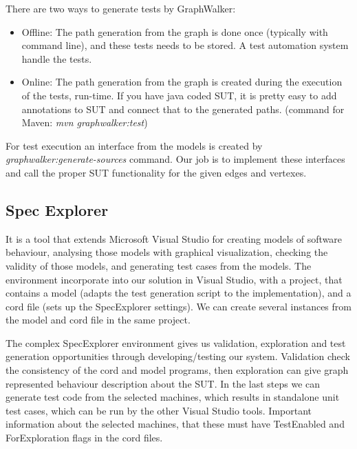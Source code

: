 There are two ways to generate tests by GraphWalker:
\begin{itemize}
	\item Offline: The path generation from the graph is done once (typically with command line), and these tests needs to be stored. A test automation system handle the tests. 
	\item Online: The path generation from the graph is created during the execution of the tests, run-time. If you have java coded SUT, it is pretty easy to add annotations to SUT and connect that to the generated paths. (command for Maven: \textit{mvn graphwalker:test})
\end{itemize}

For test execution an interface from the models is created by \textit{graphwalker:generate-sources} command. Our job is to implement these interfaces and call the proper SUT functionality for the given edges and vertexes.

\subsection{Spec Explorer} \label{mbt:tools:specExplorer}

It is a tool that extends  Microsoft Visual Studio for creating models of software behaviour, analysing those models with graphical visualization, checking the validity of those models, and generating test cases from the models. The environment incorporate into our solution in Visual Studio, with a project, that contains a model (adapts the test generation script to the implementation), and a cord file (sets up the SpecExplorer settings). We can create several instances from the model and cord file in the same project.

The complex SpecExplorer environment gives us validation, exploration and test generation opportunities through developing/testing our system. Validation check the consistency of the cord and model programs, then exploration can give graph represented behaviour description about the SUT. In the last steps we can generate test code from the selected machines, which results in standalone unit test cases, which can be run by the other Visual Studio tools. Important information about the selected machines, that these must have TestEnabled and ForExploration flags in the cord files.



